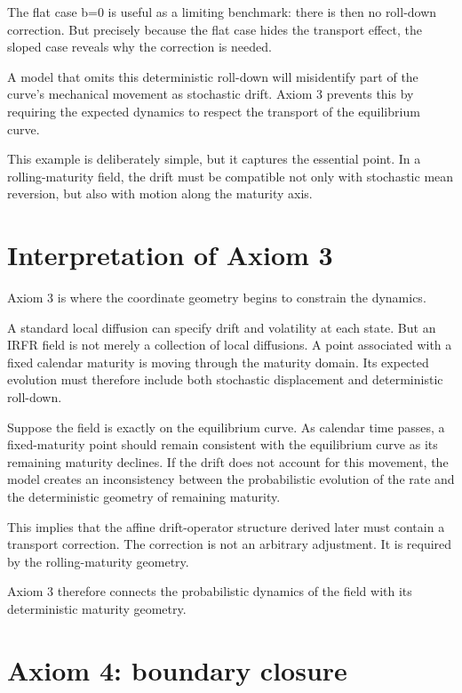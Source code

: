 \documentclass[11pt,oneside]{book}
\begin{document}
The flat case b=0 is useful as a limiting benchmark: there is then no
roll-down correction. But precisely because the flat case hides the
transport effect, the sloped case reveals why the correction is needed.

A model that omits this deterministic roll-down will misidentify part of
the curve's mechanical movement as stochastic drift. Axiom 3 prevents
this by requiring the expected dynamics to respect the transport of the
equilibrium curve.

This example is deliberately simple, but it captures the essential
point. In a rolling-maturity field, the drift must be compatible not
only with stochastic mean reversion, but also with motion along the
maturity axis.

\section{Interpretation of Axiom 3}\label{interpretation-of-axiom-3}

Axiom 3 is where the coordinate geometry begins to constrain the
dynamics.

A standard local diffusion can specify drift and volatility at each
state. But an IRFR field is not merely a collection of local diffusions.
A point associated with a fixed calendar maturity is moving through the
maturity domain. Its expected evolution must therefore include both
stochastic displacement and deterministic roll-down.

Suppose the field is exactly on the equilibrium curve. As calendar time
passes, a fixed-maturity point should remain consistent with the
equilibrium curve as its remaining maturity declines. If the drift does
not account for this movement, the model creates an inconsistency
between the probabilistic evolution of the rate and the deterministic
geometry of remaining maturity.

This implies that the affine drift-operator structure derived later must
contain a transport correction. The correction is not an arbitrary
adjustment. It is required by the rolling-maturity geometry.

Axiom 3 therefore connects the probabilistic dynamics of the field with
its deterministic maturity geometry.

\section{Axiom 4: boundary closure}\label{axiom-4-boundary-closure}
\end{document}
